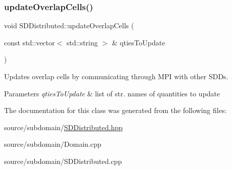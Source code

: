 \subsubsection{\texorpdfstring{update\+Overlap\+Cells()}{updateOverlapCells()}}
{\footnotesize\ttfamily void S\+D\+Distributed\+::update\+Overlap\+Cells (\begin{DoxyParamCaption}\item[{const std\+::vector$<$ std\+::string $>$ \&}]{qties\+To\+Update }\end{DoxyParamCaption})}



Updates overlap cells by communicating through M\+PI with other S\+D\+Ds. 


\begin{DoxyParams}{Parameters}
{\em qties\+To\+Update} & list of str. names of quantities to update \\
\hline
\end{DoxyParams}


The documentation for this class was generated from the following files\+:\begin{DoxyCompactItemize}
\item 
source/subdomain/\hyperlink{source_2subdomain_2SDDistributed_8hpp}{S\+D\+Distributed.\+hpp}\item 
source/subdomain/Domain.\+cpp\item 
source/subdomain/S\+D\+Distributed.\+cpp\end{DoxyCompactItemize}
